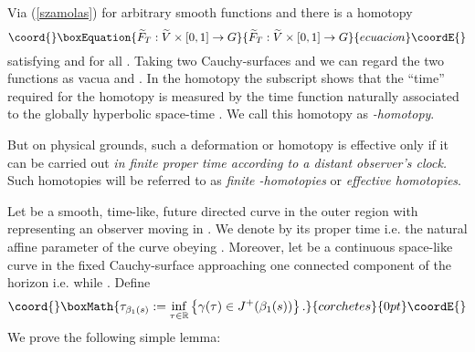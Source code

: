 \documentclass[a4paper,12pt,draft]{article}
\providecommand{\R}{{\mathbb R}}
\begin{document}
Via (\ref{szamolas}) for arbitrary smooth functions
\coordHE{} and 
\coordHE{} there is a homotopy
\begin{equation}\coord{}\boxEquation{
\widetilde{F}_T: \widetilde{V}\times [0,1]\rightarrow G
\label{T-homotopia}
}{
\widetilde{F}_T: \widetilde{V}\times [0,1]\rightarrow G
}{ecuacion}\coordE{}\end{equation}
satisfying \coordHE{} and
\coordHE{} for all \coordHE{}.
Taking two Cauchy-surfaces \coordHE{} and \coordHE{} we can regard the two functions as vacua \coordHE{} and \coordHE{}. In the homotopy \coordHE{} the
subscript \coordHE{} shows that the ``time'' required for the homotopy is
measured by the time function \coordHE{} naturally associated to the globally
hyperbolic space-time \coordHE{}. We call this homotopy as {\it
{}\coordHE{}-homotopy}.

But on physical grounds, such a deformation or homotopy is effective 
only if it can be carried out {\it in finite proper time according to a
distant observer's clock.} Such homotopies will be referred to as
{\it finite \myHighlight{$\gamma$}\coordHE{}-homotopies} or {\it effective homotopies}.

Let \myHighlight{$\gamma :\R^+\rightarrow N$}\coordHE{} be a smooth, time-like, future directed
curve in the outer region \coordHE{} with \coordHE{} representing an observer moving in \coordHE{}. We denote by \myHighlight{$\tau$}\coordHE{} its
proper time i.e. the natural affine parameter of the curve
\myHighlight{$\gamma$}\coordHE{} obeying \coordHE{}. 
Moreover, let \coordHE{} be a continuous space-like
curve in the fixed Cauchy-surface \coordHE{} approaching one connected
component of the horizon i.e. \coordHE{} while \coordHE{}. Define
\[\coord{}\boxMath{\tau_{\beta_1(s)}:=\inf\limits_{\tau\in\R}\left\{\gamma (\tau )\in
J^+(\beta_1(s))\right\} .}{corchetes}{0pt}\coordE{}\]
We prove the following simple lemma:
\vspace{0.1in}
\end{document}

